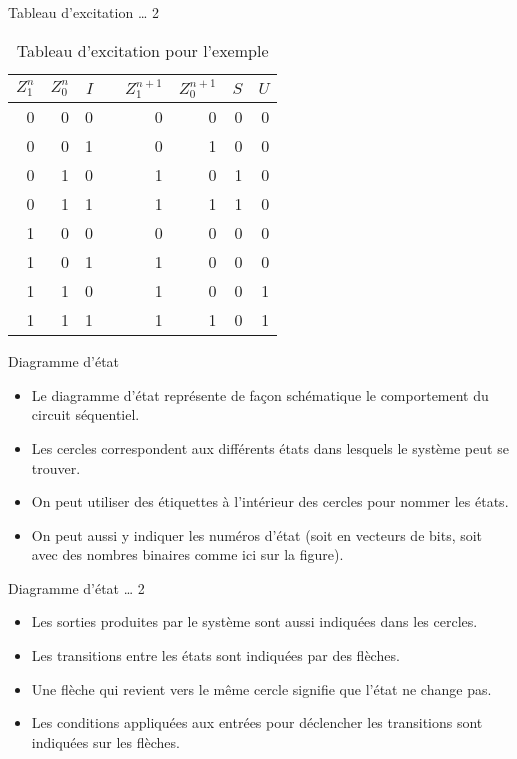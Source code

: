 \documentclass[presentation]{beamer}
\begin{document}
\begin{frame}[label={sec:org55fe1d2}]{Tableau d'excitation \ldots{} 2}
\begin{table}[htbp]
\caption{\label{tab:orgdd7b5f1}Tableau d'excitation pour l'exemple}
\centering
\begin{tabular}{rrrlrrrr}
\(Z_1^n\) & \(Z_0^n\) & \(I\) &  & \(Z_1^{n+1}\) & \(Z_0^{n+1}\) & \(S\) & \(U\)\\[0pt]
\hline
0 & 0 & 0 &  & 0 & 0 & 0 & 0\\[0pt]
0 & 0 & 1 &  & 0 & 1 & 0 & 0\\[0pt]
0 & 1 & 0 &  & 1 & 0 & 1 & 0\\[0pt]
0 & 1 & 1 &  & 1 & 1 & 1 & 0\\[0pt]
1 & 0 & 0 &  & 0 & 0 & 0 & 0\\[0pt]
1 & 0 & 1 &  & 1 & 0 & 0 & 0\\[0pt]
1 & 1 & 0 &  & 1 & 0 & 0 & 1\\[0pt]
1 & 1 & 1 &  & 1 & 1 & 0 & 1\\[0pt]
\end{tabular}
\end{table}
\end{frame}

\begin{frame}[label={sec:org729eb14}]{Diagramme d'état}
\begin{itemize}
\item Le diagramme d'état représente de façon schématique le comportement du circuit séquentiel.

\item Les cercles correspondent aux différents états dans lesquels le système peut se trouver.

\item On peut utiliser des étiquettes à l'intérieur des cercles pour nommer les états.

\item On peut aussi y indiquer les numéros d'état (soit en vecteurs de bits, soit avec des nombres binaires comme ici sur la figure).
\end{itemize}
\end{frame}

\begin{frame}[label={sec:org11c02eb}]{Diagramme d'état \ldots{} 2}
\begin{itemize}
\item Les sorties produites par le système sont aussi indiquées dans les cercles.

\item Les transitions entre les états sont indiquées par des flèches.

\item Une flèche qui revient vers le même cercle signifie que l'état ne change pas.

\item Les conditions appliquées aux entrées pour déclencher les transitions sont indiquées sur les flèches.
\end{itemize}
\end{frame}
\end{document}
